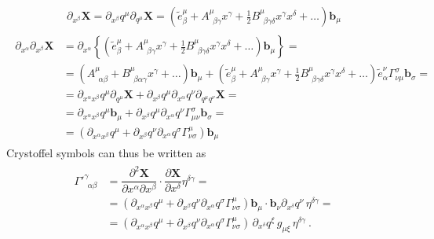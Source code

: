 \documentclass[letterpaper,10pt,english]{jupyterBook}
\begin{document}
\begin{equation*}
\begin{split}\partial_{x^\beta} \mathbf{X} = \partial_{x^\beta} q^{\mu} \partial_{q^\mu} \mathbf{X} = \left( \widetilde{e}^{\mu}_{\beta} + A^{\mu}_{\ \ \beta \gamma} x^\gamma + \frac{1}{2} B^{\mu}_{\ \ \beta \gamma \delta} x^{\gamma} x^{\delta} + \dots \right) \mathbf{b}_{\mu}\end{split}
\end{equation*}\begin{equation*}
\begin{split}\begin{aligned}
  \partial_{x^\alpha} \partial_{x^\beta} \mathbf{X} 
  & = \partial_{x^{\alpha}} \left\{ \left( \widetilde{e}^{\mu}_{\beta} + A^{\mu}_{\ \ \beta \gamma} x^\gamma + \frac{1}{2} B^{\mu}_{\ \ \beta \gamma \delta} x^{\gamma} x^{\delta} + \dots \right) \mathbf{b}_{\mu} \right\} = \\
  & = \left( A^{\mu}_{\ \ \alpha \beta} + B^{\mu}_{\ \ \beta \alpha \gamma} x^{\gamma} + \dots \right) \mathbf{b}_{\mu} + \left( \widetilde{e}^{\mu}_{\beta} + A^{\mu}_{\ \ \beta \gamma} x^\gamma + \frac{1}{2} B^{\mu}_{\ \ \beta \gamma \delta} x^{\gamma} x^{\delta} + \dots \right) \widetilde{e}^{\nu}_{\alpha} \Gamma_{\nu \mu}^{\sigma} \mathbf{b}_{\sigma} = \\
  & = \partial_{x^\alpha x^\beta} q^{\mu} \partial_{q^{\mu}} \mathbf{X} + \partial_{x^\beta} q^{\mu} \partial_{x^\alpha} q^{\nu} \partial_{q^{\mu} q^{\nu}} \mathbf{X} = \\
  & = \partial_{x^\alpha x^\beta} q^{\mu} \mathbf{b}_{\mu} + \partial_{x^\beta} q^{\mu} \partial_{x^\alpha} q^{\nu} \Gamma_{\mu \nu}^{\sigma} \mathbf{b}_{\sigma} = \\
  & = \left(  \partial_{x^\alpha x^\beta} q^{\mu} + \partial_{x^\beta} q^{\nu} \partial_{x^\alpha} q^{\sigma} \Gamma_{\nu \sigma}^{\mu} \right) \mathbf{b}_{\mu}
\end{aligned}\end{split}
\end{equation*}
\sphinxAtStartPar
Crystoffel symbols can thus be written as
\begin{equation}\label{equation:ch/relativity-general/local-inertial-reference-frame-and-equivalence-principle:eq-gamma-transf-q}
\begin{split}\begin{aligned}
  {\Gamma'}^{\gamma}_{\ \ \alpha \beta} 
  & = \dfrac{\partial^2 \mathbf{X}}{\partial x^\alpha \partial x^\beta} \cdot \dfrac{\partial \mathbf{X}}{\partial x^\delta} \eta^{\delta \gamma} = \\
  & = \left(  \partial_{x^\alpha x^\beta} q^{\mu} + \partial_{x^\beta} q^{\nu} \partial_{x^\alpha} q^{\sigma} \Gamma_{\nu \sigma}^{\mu} \right) \mathbf{b}_{\mu} \cdot \mathbf{b}_{\nu} \partial_{x^\delta} q^{\nu} \, \eta^{\delta \gamma} = \\
  & = \left(  \partial_{x^\alpha x^\beta} q^{\mu} + \partial_{x^\beta} q^{\nu} \partial_{x^\alpha} q^{\sigma} \Gamma_{\nu \sigma}^{\mu} \right) \, \partial_{x^\delta} q^{\xi}  \, g_{\mu \xi}\, \eta^{\delta \gamma} \ .
\end{aligned}\end{split}
\end{equation}
\end{document}
